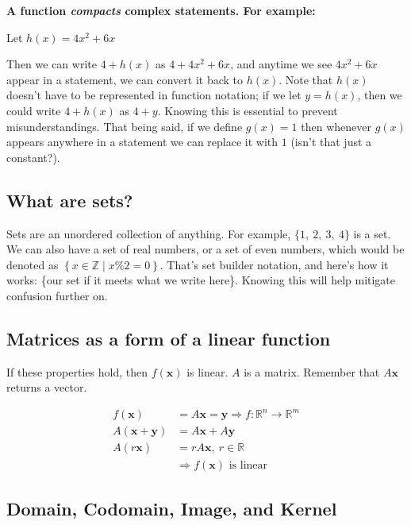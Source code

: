\documentclass[
]{article}
\newcounter{example}
\begin{document}
\textbf{A function \emph{compacts} complex statements. For example:}

Let $h(x) = 4x^{2} + 6x$

Then we can write $4 + h(x)$ as $4 + 4x^{2} + 6x$, and anytime we
see $4x^{2} + 6x$ appear in a statement, we can convert it back to
$h(x)$. Note that $h(x)$ doesn't have to be represented in function
notation; if we let $y = h(x)$, then we could write $4 + h(x)$ as
$4 + y$. Knowing this is essential to prevent misunderstandings. That
being said, if we define $g(x) = 1$ then whenever $g(x)$ appears
anywhere in a statement we can replace it with $1$ (isn't that just a
constant?).


\subsection{What are sets?}

Sets are an unordered collection of anything. For example,
$\{ 1,\ 2,\ 3,\ 4\}$ is a set. We can also have a set of real numbers,
or a set of even numbers, which would be denoted as
$\left\{ x\mathbb{\in Z}\mid x\% 2 = 0 \right\}$. That's set builder
notation, and here's how it works: \{our set \textbar{} if it meets what
we write here\}. Knowing this will help mitigate confusion further on.


\subsection{Matrices as a form of a linear
function}

If these properties hold, then $f(\mathbf{x})$ is linear. $A$ is
a matrix. Remember that $A\mathbf{x}$ returns a vector.

\begin{align*}
f\left( \mathbf{x} \right) &= A\mathbf{x} = \mathbf{y} \Rightarrow f:\mathbb{R}^{n} \rightarrow \mathbb{R}^{m}
 \\
A\left( \mathbf{x} + \mathbf{y} \right) &= A\mathbf{x} + A\mathbf{y}
 \\
A\left( r\mathbf{x} \right) &= rA\mathbf{x},\ r\mathbb{\in R}
 \\
&\Rightarrow f\left( \mathbf{x} \right)\text{\ is\ linear}
\end{align*}



\subsection{Domain, Codomain, Image, and
Kernel}
\end{document}
